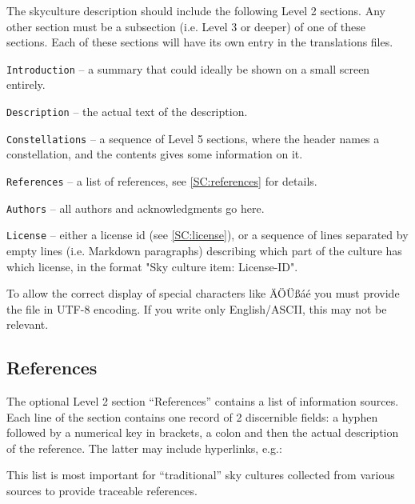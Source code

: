 The skyculture description should include the following Level 2 sections. Any other section must be a subsection (i.e. Level 3 or deeper) of one of these sections. Each of these sections will have its own entry in the translations files.

\begin{description}
\item \texttt{Introduction} -- a summary that could ideally be shown on a small screen entirely.
\item \texttt{Description} -- the actual text of the description.
\item \texttt{Constellations} -- a sequence of Level 5 sections, where the header names a constellation, and the contents gives some information on it.
\item \texttt{References} -- a list of references, see \ref{SC:references} for details.
\item \texttt{Authors} -- all authors and acknowledgments go here.
\item \texttt{License} -- either a license id (see \ref{SC:license}), or a sequence of lines separated by empty lines (i.e. Markdown paragraphs) describing which part of the culture has which license, in the format "Sky culture item: License-ID".
\end{description}

To allow the correct display of special characters like ÄÖÜßáé you must provide the file in UTF-8 encoding. 
If you write only English/ASCII, this may not be relevant.


\subsection{References}
\label{sec:skycultures:references}
\label{SC:references}

The optional Level 2 section ``References'' contains a list of information sources. 
Each line of the section contains one record of 2 discernible fields: 
a hyphen followed by a numerical key in brackets, 
a colon and then the actual description of the reference. The latter may include hyperlinks,
 e.g.:


This list is most important for ``traditional'' sky cultures collected from various sources to provide traceable references. 

